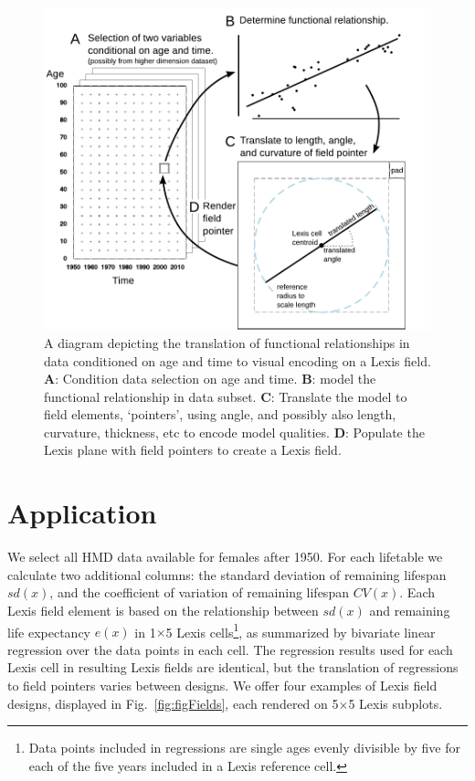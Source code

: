 \documentclass{article}
\begin{document}
\begin{figure}[ht!]
  \centering
  \includegraphics[scale=.8]{Figures/ExplainerDiagram.pdf}
  \caption{A diagram depicting the translation of functional relationships in data conditioned on age and time to visual encoding on a Lexis field. \textbf{A}: Condition data selection on age and time. \textbf{B}: model the functional relationship in data subset. \textbf{C}: Translate the model to field elements, `pointers', using angle, and possibly also length, curvature, thickness, etc to encode model qualities. \textbf{D}: Populate the Lexis plane with field pointers to create a Lexis field.}
  \label{fig:explain}
\end{figure}

\section{Application}
We select all HMD data available for females after 1950. For each lifetable we calculate two additional columns: the standard deviation of remaining lifespan $sd(x)$, and the coefficient of variation of remaining lifespan $CV(x)$. Each Lexis field element is based on the relationship between $sd(x)$ and remaining life expectancy $e(x)$ in 1$\times$5 Lexis cells\footnote{Data points included in regressions are single ages evenly divisible by five for each of the five years included in a Lexis reference cell.}, as summarized by bivariate linear regression over the data points in each cell. The regression results used for each Lexis cell in resulting Lexis fields are identical, but the translation of regressions to field pointers varies between designs. We offer four examples of Lexis field designs, displayed in Fig.~\ref{fig:figFields}, each rendered on 5$\times$5 Lexis subplots.
\end{document}
